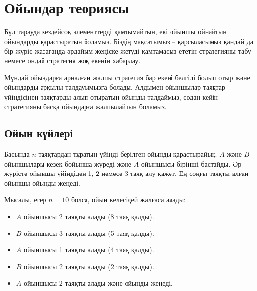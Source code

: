 \chapter{Ойындар теориясы}

Бұл тарауда кездейсоқ элементтерді қамтымайтын, екі ойыншы 
ойнайтын ойындарды қарастыратын боламыз. Біздің мақсатымыз --
қарсыласымыз қандай да бір жүріс жасағанда әрдайым жеңіске 
жетуді қамтамасыз ететін стратегияны 
табу немесе ондай стратегия жоқ екенін хабарлау. %


Мұндай ойындарға арналған жалпы стратегия бар екені белгілі болып отыр
және ойындарды  арқылы талдауымызға болады.
Алдымен ойыншылар таяқтар үйіндісінен таяқтарды алып отыратын ойынды
талдаймыз, содан кейін стратегияны басқа ойындарға
жалпылайтын боламыз. 


\section{Ойын күйлері}

Басында $n$ таяқтардан тұратын үйінді берілген 
ойынды қарастырайық. $A$ және $B$ ойыншылары кезек бойынша
жүреді және $A$ ойыншысы бірінші бастайды. Әр жүрісте
ойыншы үйіндіден 1, 2 немесе 3 таяқ алу қажет. Ең соңғы таяқты алған ойыншы ойынды жеңеді. 


Мысалы, егер $n=10$ болса, ойын келесідей жалғаса алады:
\begin{itemize}[noitemsep]
\item $A$ ойыншысы 2 таяқты алады (8 таяқ қалды).
\item $B$ ойыншысы 3 таяқты алады (5 таяқ қалды).
\item $A$ ойыншысы 1 таяқты алады (4 таяқ қалды).
\item $B$ ойыншысы 2 таяқты алады (2 таяқ қалды).
\item $A$ ойыншысы 2 таяқты алады және ойынды жеңеді.
\end{itemize}

